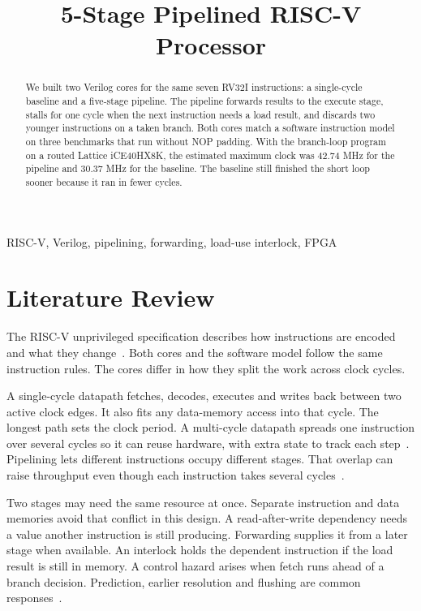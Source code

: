 \documentclass[conference]{IEEEtran}
\title{5-Stage Pipelined RISC-V Processor}
\author{\IEEEauthorblockN{Aryan Kinha, Preetish Ubhrani, Divyanshu Singh,\\Jatin Kumar Singh, Jatin Verma}
\IEEEauthorblockA{Newton School of Technology, Rishihood University}}
\begin{document}
\raggedbottom
\maketitle

\begin{abstract}
We built two Verilog cores for the same seven RV32I instructions: a single-cycle baseline and a five-stage pipeline. The pipeline forwards results to the execute stage, stalls for one cycle when the next instruction needs a load result, and discards two younger instructions on a taken branch. Both cores match a software instruction model on three benchmarks that run without NOP padding. With the branch-loop program on a routed Lattice iCE40HX8K, the estimated maximum clock was 42.74 MHz for the pipeline and 30.37 MHz for the baseline. The baseline still finished the short loop sooner because it ran in fewer cycles.
\end{abstract}
\begin{IEEEkeywords}
RISC-V, Verilog, pipelining, forwarding, load-use interlock, FPGA
\end{IEEEkeywords}

\section{Literature Review}
The RISC-V unprivileged specification describes how instructions are encoded and what they change~\cite{isa}. Both cores and the software model follow the same instruction rules. The cores differ in how they split the work across clock cycles.

A single-cycle datapath fetches, decodes, executes and writes back between two active clock edges. It also fits any data-memory access into that cycle. The longest path sets the clock period. A multi-cycle datapath spreads one instruction over several cycles so it can reuse hardware, with extra state to track each step~\cite{patterson}. Pipelining lets different instructions occupy different stages. That overlap can raise throughput even though each instruction takes several cycles~\cite{harris}.

Two stages may need the same resource at once. Separate instruction and data memories avoid that conflict in this design. A read-after-write dependency needs a value another instruction is still producing. Forwarding supplies it from a later stage when available. An interlock holds the dependent instruction if the load result is still in memory. A control hazard arises when fetch runs ahead of a branch decision. Prediction, earlier resolution and flushing are common responses~\cite{patterson,harris}.
\end{document}
